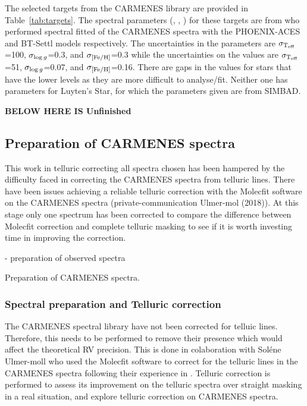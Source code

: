 The selected targets from the {CARMENES} library are provided in Table~\ref{tab:targets}.
The spectral parameters (\Teff{}, \Logg{}, \feh{}) for these targets are from \citep{passegger_carmenes_2018, rajpurohit_exploring_2018} who performed spectral fitted of the {CARMENES} spectra with the PHOENIX-ACES and BT-Settl models respectively.
The uncertainties in the \citet{rajpurohit_exploring_2018} parameters are \(\sigma_{\textrm{T}_{\mathrm{eff}}{}}\)=100\K{}, \(\sigma_{\log{g}{}}\)=0.3, and \(\sigma_{\feh{}}\)=0.3 while the uncertainties on the 
\citep{passegger_carmenes_2018} values are \(\sigma_{\textrm{T}_{\mathrm{eff}}{}}\)=51\K{}, \(\sigma_{\log{g}{}}\)=0.07, and \(\sigma_{\feh{}}\)=0.16.
There are gaps in the \citet{passegger_carmenes_2018} values for stars that have the lower \snr{} levels as they are more difficult to analyse/fit.
Neither one has parameters for Luyten's Star, for which the parameters given are from SIMBAD.

\begin{landscape}
    
\end{landscape}



\textbf{BELOW HERE IS Unfinished}


\subsection{Preparation of {CARMENES} spectra}
\label{subsec:prepatation_on_carmenes}
This work in telluric correcting all spectra chosen has been hampered by the difficulty faced in correcting the {CARMENES} spectra from telluric lines.
There have been issues achieving a reliable telluric correction with the Molecfit software on the {CARMENES} spectra (private-communication Ulmer-mol (2018)).
At this stage only one spectrum has been corrected to compare the difference between Molecfit correction and complete telluric masking to see if it is worth investing time in improving the correction.


- preparation of observed spectra

Preparation of {CARMENES} spectra.



\subsubsection{Spectral preparation and Telluric correction}
\label{subsec:prepatation_on_carmenes}
The {CARMENES} spectral library have not been corrected for telluic lines.
Therefore, this needs to be performed to remove their presence which would affect the theoretical {RV} precision.
This is done in colaboration with Sol\'ene Ulmer-moll who used the Molecfit software \citep{smette_molecfit_2015} to correct for the telluric lines in the {CARMENES} spectra following their experience in \citet{ulmer-moll_telluric_2018}. 
Telluric correction is performed to assess its improvement on the telluric spectra over straight masking in a real situation, and explore telluric correction on {CARMENES} spectra.
 
